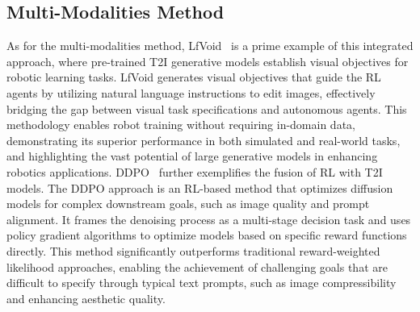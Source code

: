 \subsection{Multi-Modalities Method}

As for the multi-modalities method, LfVoid~\citep{gao2023can} is a prime example of this integrated approach, where pre-trained T2I generative models establish visual objectives for robotic learning tasks. LfVoid generates visual objectives that guide the RL agents by utilizing natural language instructions to edit images, effectively bridging the gap between visual task specifications and autonomous agents. This methodology enables robot training without requiring in-domain data, demonstrating its superior performance in both simulated and real-world tasks, and highlighting the vast potential of large generative models in enhancing robotics applications. DDPO~\citep{black2023training} further exemplifies the fusion of RL with T2I models. The DDPO approach is an RL-based method that optimizes diffusion models for complex downstream goals, such as image quality and prompt alignment. It frames the denoising process as a multi-stage decision task and uses policy gradient algorithms to optimize models based on specific reward functions directly. This method significantly outperforms traditional reward-weighted likelihood approaches, enabling the achievement of challenging goals that are difficult to specify through typical text prompts, such as image compressibility and enhancing aesthetic quality.

